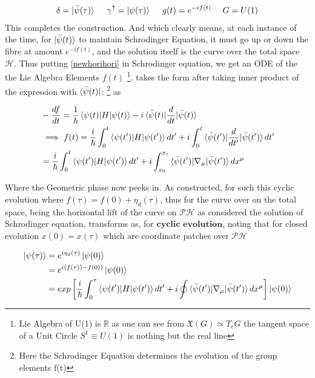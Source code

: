 \documentclass[8pt, twocoloumn]{article}
\begin{document}
\begin{align}
    \delta  = \ket{\bar{\psi}(\tau)}  \ \ \ \ \gamma^{\uparrow} = \ket{\psi(\tau)} \ \ \ \ g(t) = e^{-if(t)} \ \ \ \ G = U(1)
\end{align}
This completes the construction. And which clearly means, at each instance of the time, for $\ket{\bar{\psi}(t)}$ to maintain Schrodinger Equation, it must go up or down the fibre at amount  $e^{-if(t)}$, and the solution itself is the curve over the total space $\mathcal{H}$. Thus putting \ref{newhorihori} in Schrodinger equation, we get an ODE of the the Lie Algebra Elements $f(t)$ \footnote{Lie Algebra of U(1) is $\mathbb{R}$ as one can see from $\mathfrak{X}(G) \simeq T_eG$ the tangent space of a Unit Circle $S^1 \equiv U(1)$ is nothing but the real line}. takes the form after taking inner product of the expression with $\bra{\bar{\psi}(t)}$: \footnote{Here the Schrodinger Equation determines the evolution of the group elements f(t)} as \cite{aharanovanandan}

\begin{align}
    & -\frac{df}{dt} = \frac{1}{\hbar} \braket{\psi(t)|H|\psi(t)} - i \braket{\bar{\psi}(t)|\frac{d}{dt}|\bar{\psi}(t)}\\ 
    & \implies f(t) = \frac{i}{\hbar} \int_0^{t} \braket{\psi(t')|H|\psi(t')} dt' + i  \int_0^{t}\braket{\bar{\psi}(t')|\frac{d}{dt'}|\bar{\psi}(t')}dt' \\ 
    &= \frac{i}{\hbar} \int_0^{t} \braket{\psi(t')|H|\psi(t')} dt' + i  \int_{x_0}^{x_t}\braket{\bar{\psi}(t')|\nabla_{\mu}|\bar{\psi}(t')}dx^{\mu} 
\end{align}

Where the Geometric phase now peeks in. As constructed, for such this cyclic evolution where $f(\tau)= f(0) + \eta_d(\tau)$, thus for the curve over on the total space, being the horizontal lift of the curve on $\mathcal{PH}$ as considered the solution of Schrodinger equation, transforms as, for $\textbf{cyclic evolution}$, noting that for closed evolution $x(0) = x(\tau)$ which are coordinate patches over $\mathcal{PH}$

\begin{align}
    \ket{\psi(\tau)} &= e^{i \eta_d(\tau)} \ket{\psi(0)}\\
    &= e^{i(f(\tau)) - f(0))} \ket{\psi(0)} \\ 
    &= exp  \left[   \frac{i}{\hbar} \int_0^{\tau} \braket{\psi(t')|H|\psi(t')} dt' + i  \oint \braket{\bar{\psi}(t')|\nabla_{\mu}|\bar{\psi}(t')}dx^{\mu}  \right]\ket{\psi(0)} 
\end{align}
\end{document}
